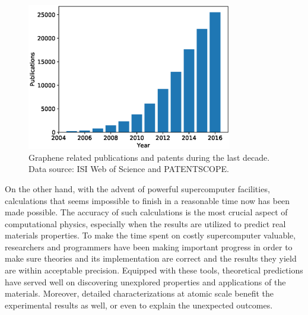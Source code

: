 \begin{figure}[htbp!] 
\centering  
\includegraphics[width=0.8\textwidth]{graphene_papers.eps}
\caption[Graphene related publications and patents during the last decade]{Graphene related publications and patents during the last decade. Data source: ISI Web of Science and PATENTSCOPE. \protect\footnotemark }
\label{fig:grpapers}
\end{figure} 

On the other hand, with the advent of powerful supercomputer facilities, calculations that seems impossible to finish in a reasonable time now has been made possible. The accuracy of such calculations is the most crucial aspect of computational physics, especially when the results are utilized to predict real materials properties. To make the time spent on costly supercomputer valuable, researchers and programmers have been making important progress in order to make sure theories and its implementation are correct and the results they yield are within acceptable precision. Equipped with these tools, theoretical predictions have served well on discovering unexplored properties and applications of the materials. Moreover, detailed characterizations at atomic scale benefit the experimental results as well, or even to explain the unexpected outcomes.


